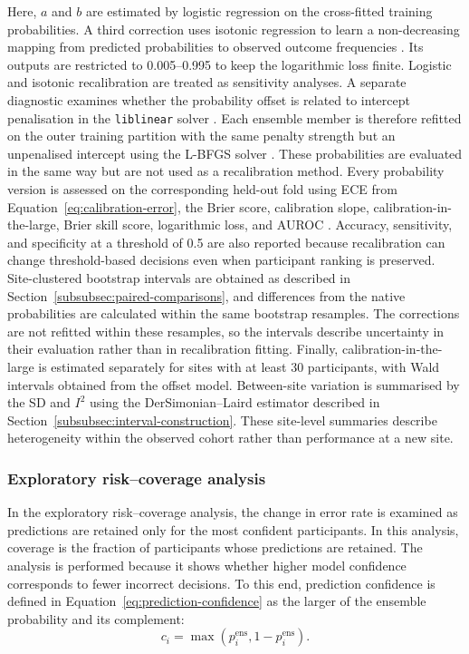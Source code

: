 Here, $a$ and $b$ are estimated by logistic regression on the cross-fitted training probabilities. A third correction uses isotonic regression to learn a non-decreasing mapping from predicted probabilities to observed outcome frequencies \citep{ZadroznyElkan2002}. Its outputs are restricted to 0.005--0.995 to keep the logarithmic loss finite. Logistic and isotonic recalibration are treated as sensitivity analyses. A separate diagnostic examines whether the probability offset is related to intercept penalisation in the \texttt{liblinear} solver \citep{Fanetal2008}. Each ensemble member is therefore refitted on the outer training partition with the same penalty strength but an unpenalised intercept using the L-BFGS solver \citep{Pedregosaetal2011}. These probabilities are evaluated in the same way but are not used as a recalibration method. Every probability version is assessed on the corresponding held-out fold using ECE from Equation~\eqref{eq:calibration-error}, the Brier score, calibration slope, calibration-in-the-large, Brier skill score, logarithmic loss, and AUROC \citep{VanCalsteretal2019,Steyerbergetal2010}. Accuracy, sensitivity, and specificity at a threshold of 0.5 are also reported because recalibration can change threshold-based decisions even when participant ranking is preserved. Site-clustered bootstrap intervals are obtained as described in Section~\ref{subsubsec:paired-comparisons}, and differences from the native probabilities are calculated within the same bootstrap resamples. The corrections are not refitted within these resamples, so the intervals describe uncertainty in their evaluation rather than in recalibration fitting. Finally, calibration-in-the-large is estimated separately for sites with at least 30 participants, with Wald intervals obtained from the offset model. Between-site variation is summarised by the SD and $I^2$ using the DerSimonian--Laird estimator described in Section~\ref{subsubsec:interval-construction}. These site-level summaries describe heterogeneity within the observed cohort rather than performance at a new site.

\subsubsection{Exploratory risk--coverage analysis}
\label{subsubsec:risk-coverage}

In the exploratory risk--coverage analysis, the change in error rate is examined as
predictions are retained only for the most confident participants. In this analysis,
coverage is the fraction of participants whose predictions are retained. The analysis is
performed because it shows whether higher model confidence corresponds to fewer incorrect
decisions. To this end, prediction confidence is defined in Equation~\eqref{eq:prediction-confidence} as the
larger of the ensemble probability and its complement:
\begin{equation}
c_i
=
\max\left(p_i^{\mathrm{ens}},1-p_i^{\mathrm{ens}}\right).
\label{eq:prediction-confidence}
\end{equation}

